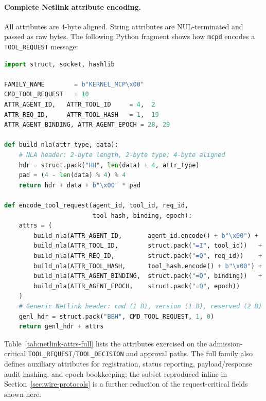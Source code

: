 \paragraph{Complete Netlink attribute encoding.}

All attributes are 4-byte aligned.
String attributes are NUL-terminated and passed as raw bytes.
The following Python fragment shows how \texttt{mcpd} encodes a \texttt{TOOL\_REQUEST} message:

\begin{lstlisting}[style=codestyle, language=Python, caption={Python fragment: encoding a \texttt{TOOL\_REQUEST} Generic Netlink message (mcpd $\to$ kernel).}]
import struct, socket, hashlib

FAMILY_NAME        = b"KERNEL_MCP\x00"
CMD_TOOL_REQUEST   = 10
ATTR_AGENT_ID,   ATTR_TOOL_ID     = 4,  2
ATTR_REQ_ID,     ATTR_TOOL_HASH   = 1,  19
ATTR_AGENT_BINDING, ATTR_AGENT_EPOCH = 28, 29

def build_nla(attr_type, data):
    # NLA header: 2-byte length, 2-byte type; 4-byte aligned
    hdr = struct.pack("HH", len(data) + 4, attr_type)
    pad = (4 - len(data) % 4) % 4
    return hdr + data + b"\x00" * pad

def encode_tool_request(agent_id, tool_id, req_id,
                        tool_hash, binding, epoch):
    attrs = (
        build_nla(ATTR_AGENT_ID,       agent_id.encode() + b"\x00") +
        build_nla(ATTR_TOOL_ID,        struct.pack("=I", tool_id))   +
        build_nla(ATTR_REQ_ID,         struct.pack("=Q", req_id))    +
        build_nla(ATTR_TOOL_HASH,      tool_hash.encode() + b"\x00") +
        build_nla(ATTR_AGENT_BINDING,  struct.pack("=Q", binding))   +
        build_nla(ATTR_AGENT_EPOCH,    struct.pack("=Q", epoch))
    )
    # Generic Netlink header: cmd (1 B), version (1 B), reserved (2 B)
    genl_hdr = struct.pack("BBH", CMD_TOOL_REQUEST, 1, 0)
    return genl_hdr + attrs
\end{lstlisting}

Table~\ref{tab:netlink-attrs-full} lists the attributes exercised on the admission-critical \texttt{TOOL\_\allowbreak REQUEST}/\texttt{TOOL\_\allowbreak DECISION} and approval paths.
The full family also defines auxiliary attributes for registration, status reporting, payload/response audit hashing, and epoch bookkeeping; the subset reproduced inline in Section~\ref{sec:wire-protocols} is a further reduction of the request-critical fields shown here.

